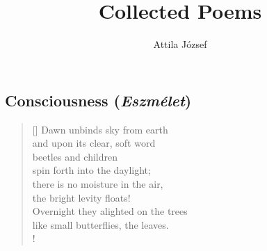 \documentclass[a4paper,12pt,twoside,final]{book}
\title{Collected Poems}
\author{Attila József}
\begin{document}
\maketitle

\chapter{}
\section{Consciousness (\emph{Eszmélet})}




\settowidth{\versewidth}{Overnight they alighted on the trees}

\begin{verse}[\versewidth]
  Dawn unbinds sky from earth \\
  and upon its clear, soft word \\
  beetles and children \\
  spin forth into the daylight; \\
  there is no moisture in the air, \\
  the bright levity floats! \\
  Overnight they alighted on the trees \\
  like small butterflies, the leaves. \\!
\end{verse}


\newpage

\settowidth{\versewidth}{a hajnal s tiszta, lágy szavára}
\end{document}
